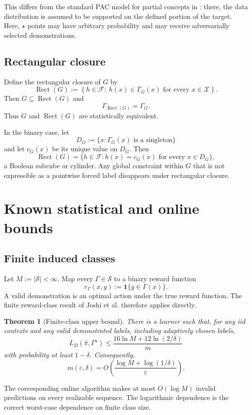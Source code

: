 \documentclass[11pt]{article}
\newtheorem{theorem}{Theorem}[section]
\theoremstyle{definition}
\theoremstyle{remark}
\newcommand{\X}{\mathcal X}
\newcommand{\F}{\mathcal F}
\newcommand{\SV}{\mathcal S}
\newcommand{\eps}{\varepsilon}
\newcommand{\Rect}{\operatorname{Rect}}
\newcommand{\1}{\mathbf 1}
\begin{document}
This differs from the standard PAC model for partial concepts in \cite{AlonEtAl2022}: there, the data distribution is assumed to be supported on the defined portion of the target. Here, $\star$ points may have arbitrary probability and may receive adversarially selected demonstrations.

\subsection{Rectangular closure}

Define the rectangular closure of $G$ by
\[
    \Rect(G)
    :=
    \left\{h\in\F:\ h(x)\in\Gamma_G(x)\text{ for every }x\in\X\right\}.
\]
Then $G\subseteq\Rect(G)$ and
\[
    \Gamma_{\Rect(G)}=\Gamma_G.
\]
Thus $G$ and $\Rect(G)$ are statistically equivalent.

In the binary case, let
\[
    D_G:=\{x:\Gamma_G(x)\text{ is a singleton}\}
\]
and let $c_G(x)$ be its unique value on $D_G$. Then
\[
    \Rect(G)=\{h\in\F:h(x)=c_G(x)\text{ for every }x\in D_G\},
\]
a Boolean subcube or cylinder. Any global constraint within $G$ that is not expressible as a pointwise forced label disappears under rectangular closure.

\section{Known statistical and online bounds}

\subsection{Finite induced classes}

Let $M:=|\SV|<\infty$. Map every $\Gamma\in\SV$ to a binary reward function
\[
    r_\Gamma(x,y):=\1\{y\in\Gamma(x)\}.
\]
A valid demonstration is an optimal action under the true reward function. The finite reward-class result of Joshi et al. \cite{JoshiEtAl2025} therefore applies directly.

\begin{theorem}[Finite-class upper bound]
There is a learner such that, for any iid contexts and any valid demonstrated labels, including adaptively chosen labels,
\[
    L_D(\widehat\pi,\Gamma^\star)
    \leq
    \frac{16\ln M+12\ln(2/\delta)}{m}
\]
with probability at least $1-\delta$. Consequently,
\[
    m(\eps,\delta)
    =O\!\left(\frac{\log M+\log(1/\delta)}{\eps}\right).
\]
\end{theorem}

The corresponding online algorithm makes at most $O(\log M)$ invalid predictions on every realizable sequence. The logarithmic dependence is the correct worst-case dependence on finite class size.
\end{document}
